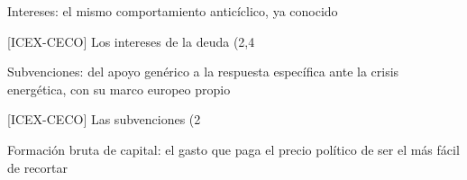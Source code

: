 \documentclass[10pt,a4paper]{article}
\newcounter{anexo}
\begin{document}
Intereses: el mismo comportamiento anticíclico, ya conocido

[ICEX-CECO] Los intereses de la deuda (2,4%

Subvenciones: del apoyo genérico a la respuesta específica ante la crisis energética, con su marco europeo propio

[ICEX-CECO] Las subvenciones (2%

Formación bruta de capital: el gasto que paga el precio político de ser el más fácil de recortar
\end{document}
